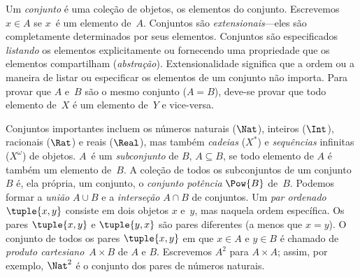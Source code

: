 Um \emph{conjunto} é uma coleção de objetos, os elementos do conjunto.
Escrevemos $x \in A$ se $x$~é um elemento de~$A$. Conjuntos são
\emph{extensionais}---eles são completamente determinados por seus
elementos. Conjuntos são especificados \emph{listando} os elementos
explicitamente ou fornecendo uma propriedade que os elementos
compartilham (\emph{abstração}). Extensionalidade significa que a ordem
ou a maneira de listar ou especificar os elementos de um conjunto não
importa. Para provar que $A$ e~$B$ são o mesmo conjunto ($A = B$),
deve-se provar que todo elemento de~$X$ é um elemento de~$Y$ e
vice-versa.

Conjuntos importantes incluem os números naturais ($\Nat$), inteiros
($\Int$), racionais ($\Rat$) e reais ($\Real$), mas também
\emph{cadeias} ($X^*$) e \emph{sequências} infinitas ($X^\omega$) de
objetos. $A$~é um \emph{subconjunto} de $B$, $A \subseteq B$, se todo
elemento de $A$ é também um elemento de~$B$. A coleção de todos os
subconjuntos de um conjunto~$B$ é, ela própria, um conjunto, o
\emph{conjunto potência} $\Pow{B}$ de~$B$. Podemos formar a
\emph{união} $A \cup B$ e a \emph{interseção} $A \cap B$ de conjuntos.
Um \emph{par ordenado} $\tuple{x, y}$ consiste em dois objetos $x$
e~$y$, mas naquela ordem específica. Os pares $\tuple{x, y}$ e
$\tuple{y, x}$ são pares diferentes (a menos que $x = y$). O conjunto de
todos os pares $\tuple{x, y}$ em que $x \in A$ e $y \in B$ é chamado de
\emph{produto cartesiano}~$A \times B$ de $A$ e $B$. Escrevemos $A^2$
para $A \times A$; assim, por exemplo, $\Nat^2$ é o conjunto dos pares
de números naturais.

